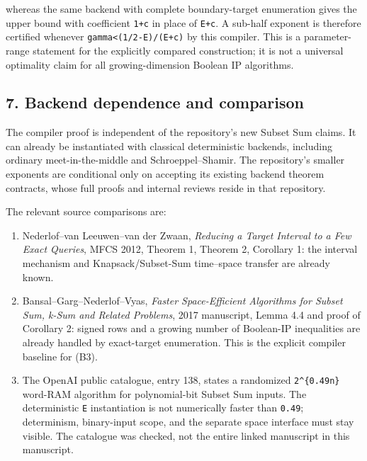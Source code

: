whereas the same backend with complete boundary-target enumeration gives the upper bound with coefficient \texttt{1+c} in place of \texttt{E+c}. A sub-half exponent is therefore certified whenever \texttt{gamma\textless{}(1/2-E)/(E+c)} by this compiler. This is a parameter-range statement for the explicitly compared construction; it is not a universal optimality claim for all growing-dimension Boolean IP algorithms.

\hypertarget{af-77b0bb6793-backend-dependence-and-comparison}{%
\subsection{7. Backend dependence and comparison}\label{af-77b0bb6793-backend-dependence-and-comparison}}

The compiler proof is independent of the repository's new Subset Sum claims. It can already be instantiated with classical deterministic backends, including ordinary meet-in-the-middle and Schroeppel--Shamir. The repository's smaller exponents are conditional only on accepting its existing backend theorem contracts, whose full proofs and internal reviews reside in that repository.

The relevant source comparisons are:

\begin{enumerate}
\def\labelenumi{\arabic{enumi}.}
\tightlist
\item
  Nederlof--van Leeuwen--van der Zwaan, \emph{Reducing a Target Interval to a Few Exact Queries}, MFCS 2012, Theorem 1, Theorem 2, Corollary 1: the interval mechanism and Knapsack/Subset-Sum time--space transfer are already known.
\item
  Bansal--Garg--Nederlof--Vyas, \emph{Faster Space-Efficient Algorithms for Subset Sum, k-Sum and Related Problems}, 2017 manuscript, Lemma 4.4 and proof of Corollary 2: signed rows and a growing number of Boolean-IP inequalities are already handled by exact-target enumeration. This is the explicit compiler baseline for (B3).
\item
  The OpenAI public catalogue, entry 138, states a randomized \texttt{2\^{}\{0.49n\}} word-RAM algorithm for polynomial-bit Subset Sum inputs. The deterministic \texttt{E} instantiation is not numerically faster than \texttt{0.49}; determinism, binary-input scope, and the separate space interface must stay visible. The catalogue was checked, not the entire linked manuscript in this manuscript.
\end{enumerate}

